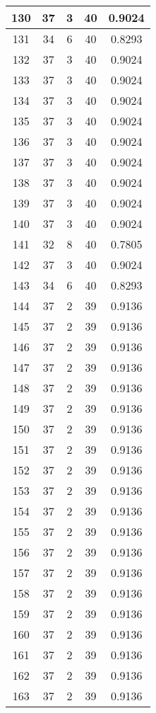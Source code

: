 \documentclass[letterpaper, 12pt]{article}
\begin{document}
\begin{longtable}{|c|c|c|c|c|}
\hline
130 & 37 & 3 & 40 & 0.9024 \\
\hline
131 & 34 & 6 & 40 & 0.8293 \\
\hline
132 & 37 & 3 & 40 & 0.9024 \\
\hline
133 & 37 & 3 & 40 & 0.9024 \\
\hline
134 & 37 & 3 & 40 & 0.9024 \\
\hline
135 & 37 & 3 & 40 & 0.9024 \\
\hline
136 & 37 & 3 & 40 & 0.9024 \\
\hline
137 & 37 & 3 & 40 & 0.9024 \\
\hline
138 & 37 & 3 & 40 & 0.9024 \\
\hline
139 & 37 & 3 & 40 & 0.9024 \\
\hline
140 & 37 & 3 & 40 & 0.9024 \\
\hline
141 & 32 & 8 & 40 & 0.7805 \\
\hline
142 & 37 & 3 & 40 & 0.9024 \\
\hline
143 & 34 & 6 & 40 & 0.8293 \\
\hline
144 & 37 & 2 & 39 & 0.9136 \\
\hline
145 & 37 & 2 & 39 & 0.9136 \\
\hline
146 & 37 & 2 & 39 & 0.9136 \\
\hline
147 & 37 & 2 & 39 & 0.9136 \\
\hline
148 & 37 & 2 & 39 & 0.9136 \\
\hline
149 & 37 & 2 & 39 & 0.9136 \\
\hline
150 & 37 & 2 & 39 & 0.9136 \\
\hline
151 & 37 & 2 & 39 & 0.9136 \\
\hline
152 & 37 & 2 & 39 & 0.9136 \\
\hline
153 & 37 & 2 & 39 & 0.9136 \\
\hline
154 & 37 & 2 & 39 & 0.9136 \\
\hline
155 & 37 & 2 & 39 & 0.9136 \\
\hline
156 & 37 & 2 & 39 & 0.9136 \\
\hline
157 & 37 & 2 & 39 & 0.9136 \\
\hline
158 & 37 & 2 & 39 & 0.9136 \\
\hline
159 & 37 & 2 & 39 & 0.9136 \\
\hline
160 & 37 & 2 & 39 & 0.9136 \\
\hline
161 & 37 & 2 & 39 & 0.9136 \\
\hline
162 & 37 & 2 & 39 & 0.9136 \\
\hline
163 & 37 & 2 & 39 & 0.9136 \\

\end{longtable}
\end{document}

